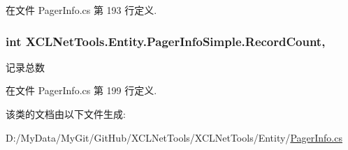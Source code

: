 在文件 Pager\-Info.\-cs 第 193 行定义.

\hypertarget{class_x_c_l_net_tools_1_1_entity_1_1_pager_info_simple_abe1bab597cad994b4515208cbb77f0bf}{
\subsubsection[{Record\-Count}]{\setlength{\rightskip}{0pt plus 5cm}int X\-C\-L\-Net\-Tools.\-Entity.\-Pager\-Info\-Simple.\-Record\-Count\hspace{0.3cm}{\ttfamily [get]}, {\ttfamily [set]}}}\label{class_x_c_l_net_tools_1_1_entity_1_1_pager_info_simple_abe1bab597cad994b4515208cbb77f0bf}


记录总数 



在文件 Pager\-Info.\-cs 第 199 行定义.



该类的文档由以下文件生成\-:\begin{DoxyCompactItemize}
\item 
D\-:/\-My\-Data/\-My\-Git/\-Git\-Hub/\-X\-C\-L\-Net\-Tools/\-X\-C\-L\-Net\-Tools/\-Entity/\hyperlink{_pager_info_8cs}{Pager\-Info.\-cs}\end{DoxyCompactItemize}
